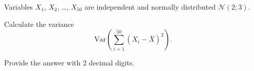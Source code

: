 
\begin{question}
Variables \(X_1\), \(X_2\), \ldots, \(X_{50}\) are independent and normally distributed \(\mathcal{N}(2; 3)\).

Calculate the variance
\[
\mathrm{Var}\left(\sum_{i=1}^{50}(X_i - \bar X)^2\right).
\]

Provide the answer with 2 decimal digits.
\end{question}


